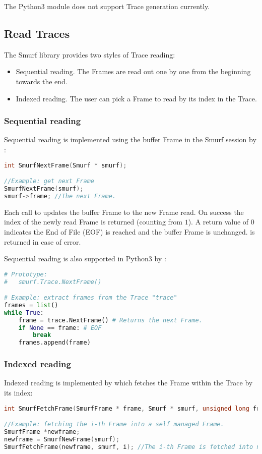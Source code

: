 The Python3  module does not support Trace generation currently.


\subsection{Read Traces\label{sec:ReadTraces}}
The Smurf library provides two styles of Trace reading:
\begin{itemize}
	\item Sequential reading. The Frames are read out one by one from the beginning towards the end.
	\item Indexed reading. The user can pick a Frame to read by its index in the Trace.
\end{itemize}

\subsubsection{Sequential reading}
Sequential reading is implemented using the buffer Frame in the Smurf session by :
\begin{lstlisting}[language=C++, caption={SmurfNextFrame()\label{api:SmurfNextFrameC}}]
int SmurfNextFrame(Smurf * smurf);

//Example: get next Frame 
SmurfNextFrame(smurf);
smurf->frame; //The next Frame.
\end{lstlisting}
Each call to  updates the buffer Frame  to the new Frame read. On success the index of the newly read Frame is returned (counting from $1$). A return value of $0$ indicates the End of File (EOF) is reached and the buffer Frame is unchanged.  is returned in case of error.

Sequential reading is also supported in Python3 by :
\begin{lstlisting}[language=Python,caption={smurf.Trace.NextFrame()\label{api:smurf.Trace.NextFrame}}]
# Prototype:
#	smurf.Trace.NextFrame()

# Example: extract frames from the Trace "trace"
frames = list()
while True:
	frame = trace.NextFrame() # Returns the next Frame.
	if None == frame: # EOF
		break
	frames.append(frame)
\end{lstlisting}

\subsubsection{Indexed reading}
Indexed reading is implemented by  which fetches the Frame within the Trace by its index:
\begin{lstlisting}[language=C++, caption={SmurfFetchFrame()\label{api:SmurfFetchFrameC}}]
int SmurfFetchFrame(SmurfFrame * frame, Smurf * smurf, unsigned long frameno);

//Example: fetching the i-th Frame into a self managed Frame.
SmurfFrame *newframe;
newframe = SmurfNewFrame(smurf);
SmurfFetchFrame(newframe, smurf, i); //The i-th Frame is fetched into newframe.
\end{lstlisting}

